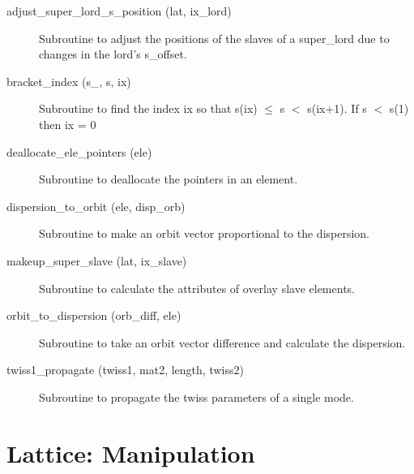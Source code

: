 \begin{description}

\item[adjust_super_lord_s_position (lat, ix_lord)] \Newline
Subroutine to adjust the positions of the slaves of a 
super_lord due to changes in the lord's s_offset. 

\item[bracket_index (s_, s, ix)] \Newline
Subroutine to find the index ix so that s(ix) $\le$ s $<$ s(ix+1). 
If s $<$ s(1) then ix = 0 

\item[deallocate_ele_pointers (ele)] \Newline
Subroutine to deallocate the pointers in an element. 

\item[dispersion_to_orbit (ele, disp_orb)] \Newline
Subroutine to make an orbit vector proportional to the dispersion. 

\item[makeup_super_slave (lat, ix_slave)] \Newline
Subroutine to calculate the attributes of overlay slave elements. 

\item[orbit_to_dispersion (orb_diff, ele)] \Newline
Subroutine to take an orbit vector difference and calculate the dispersion. 

\item[twiss1_propagate (twiss1, mat2, length, twiss2)] \Newline 
Subroutine to propagate the twiss parameters of a single mode.

\end{description}

\section{Lattice: Manipulation}
\label{r:trans}    

